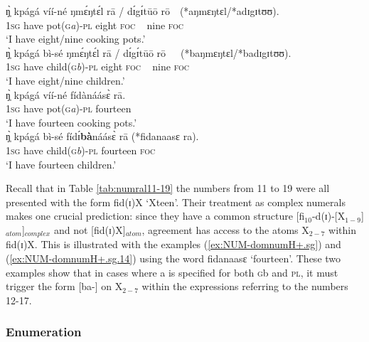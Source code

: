 \begin{exe}
\begin{exe}
\begin{exe}
\begin{exe}
\begin{exe}
\begin{exe}
\begin{exe}
\begin{exe}
\begin{exe}
\begin{exe}
\ex\label{ex:NUM-ungramhum-}
\gll   ŋ̩̀  kpágá víí-né   ŋmɛ́ŋtɛ́l rā /  dɪ́gɪ́tūō rō~~(*aŋmɛŋtɛl/*adɪgɪtʊʊ).\hspace*{-2cm}\\
  \textsc{1sg}  {have}  pot(\textsc{g}\textit{a})-\textsc{pl}  
 eight  \textsc{foc} ~ nine  \textsc{foc}\\
\glt `I have eight/nine cooking pots.'\\

\ex\label{ex:NUM-ungramhum+}
\gll    ŋ̩̀  kpágá bì-sé   ŋmɛ́ŋtɛ́l rā / dɪ́gɪ́tūō rō~~~(*baŋmɛŋtɛl/*badɪgɪtʊʊ).\hspace*{-2cm}\\
  \textsc{1sg}  {have}  {child(\textsc{g}\textit{b})-\textsc{pl}}  eight  \textsc{foc} ~ nine  \textsc{foc}\\
\glt `I have eight/nine children.'\\

\ex\label{ex:NUM-domnumH+.sg}
\gll  ŋ̩̀  kpágá víí-né   fídànáásɛ̀ rā.\\
  \textsc{1sg}  {have}  {pot(\textsc{g}\textit{a})-\textsc{pl}}  
{fourteen}\\
\glt `I have fourteen cooking pots.'\\


\ex\label{ex:NUM-domnumH+.sg.14}
\gll  ŋ̩̀  kpágá bì-sé    fídɪ́{\sls\bf bà}náásɛ̀ rā  (*fidanaasɛ ra).\\
    \textsc{1sg}  {have}  {child(\textsc{g}\textit{b})-\textsc{pl}}  
{fourteen}  \textsc{foc}  {}\\
\glt `I have fourteen children.'\\
\z
\z

Recall that in Table \ref{tab:numral11-19} the numbers from 11 to 19 were all
presented with the form
{\sls  fid(ɪ)X} `Xteen'. Their treatment as complex numerals makes one 
crucial
prediction: since they   have a common structure
[fi$_{10}$-d(ɪ)-[X$_{1-9}$]$_{atom}$]$_{complex}$ and not [fid(ɪ)X]$_{atom}$,
 agreement   has
access to the atoms X$_{2-7}$ within {\sls fid(ɪ)X}. This is
illustrated with the examples (\ref{ex:NUM-domnumH+.sg}) and
(\ref{ex:NUM-domnumH+.sg.14}) using the word {\sls fidanaasɛ}
`fourteen'.
These two examples show that in cases where a  is specified for
both \textsc{g}{\sls b} and \textsc{pl}, it must trigger the form
[ba-] on X$_{2-7}$   within the expressions referring to the numbers 12-17.



\subsubsection{Enumeration}
\label{sec:NUM-enum}


\end{exe}
\end{exe}
\end{exe}
\end{exe}
\end{exe}
\end{exe}
\end{exe}
\end{exe}
\end{exe}
\end{exe}
